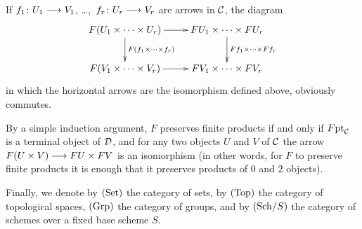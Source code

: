 \begin{1   PRELIMINARY NOTIONS}
\begin{1.2 Category theory}
If $f_1 \colon U_1 \arr V_1$, \dots,~$f_r \colon U_r \arr V_r$ are arrows in $\mathcal{C}$, the diagram
   \[
   \xymatrix{
   F(U_1 \times \dots \times U_r) \ar[r]
           \ar[d]^{F(f_1\times \dots \times f_r)} &
   F U_1 \times \dots \times F U_r \ar[d]^{Ff_1 \times \dots \times Ff_r} \\
   F(V_1 \times \dots \times V_r) \ar[r] &
   F V_1 \times \dots \times F V_r
   }
   \]
in which the horizontal arrows are the isomorphism defined above, obviously commutes.

By a simple induction argument, $F$ preserves finite products if and only if $F\mathrm{pt}_{\mathcal{C}}$ is a terminal object of $\mathcal{D}$, and for any two objects $U$ and $V$ of $\mathcal{C}$ the arrow $F(U \times V) \arr FU \times FV$ is an isomorphism (in other words, for $F$ to preserve finite products it is enough that it preserves products of $0$ and $2$ objects).



Finally, we denote by $(\mathrm{Set})$ the category of sets, by $(\mathrm{Top})$ the category of topological spaces, $(\mathrm{Grp})$ the category of groups, and by $({\mathrm{Sch}/S})$ the category of schemes over a fixed base scheme $S$.


\end{1.2 Category theory}
\end{1   PRELIMINARY NOTIONS}

